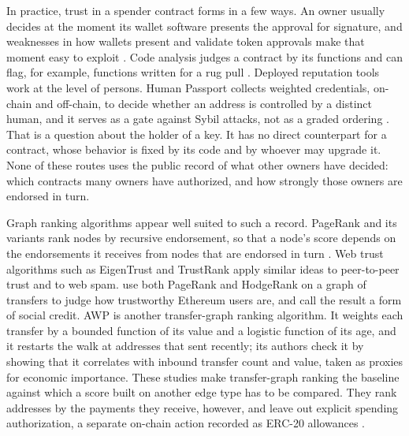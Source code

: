 In practice, trust in a spender contract forms in a few ways. An owner usually decides at the moment its wallet software presents the approval for signature, and weaknesses in how wallets present and validate token approvals make that moment easy to exploit \parencite{adamczyk2025approval}. Code analysis judges a contract by its functions and can flag, for example, functions written for a rug pull \parencite{lin2024crpwarner}. Deployed reputation tools work at the level of persons. Human Passport collects weighted credentials, on-chain and off-chain, to decide whether an address is controlled by a distinct human, and it serves as a gate against Sybil attacks, not as a graded ordering \parencite{humanpassportnddocs}. That is a question about the holder of a key. It has no direct counterpart for a contract, whose behavior is fixed by its code and by whoever may upgrade it. None of these routes uses the public record of what other owners have decided: which contracts many owners have authorized, and how strongly those owners are endorsed in turn.

Graph ranking algorithms appear well suited to such a record. PageRank and its variants rank nodes by recursive endorsement, so that a node's score depends on the endorsements it receives from nodes that are endorsed in turn \parencite{page1999pagerank}. Web trust algorithms such as EigenTrust \parencite{kamvar2003eigentrust} and TrustRank \parencite{gyongyi2004trustrank} apply similar ideas to peer-to-peer trust and to web spam. \textcite{do2023hodgerank} use both PageRank and HodgeRank on a graph of transfers to judge how trustworthy Ethereum users are, and call the result a form of social credit. AWP \parencite{do2023awp} is another transfer-graph ranking algorithm. It weights each transfer by a bounded function of its value and a logistic function of its age, and it restarts the walk at addresses that sent recently; its authors check it by showing that it correlates with inbound transfer count and value, taken as proxies for economic importance. These studies make transfer-graph ranking the baseline against which a score built on another edge type has to be compared. They rank addresses by the payments they receive, however, and leave out explicit spending authorization, a separate on-chain action recorded as ERC-20 allowances \parencite{vogelsteller2015erc20}.


